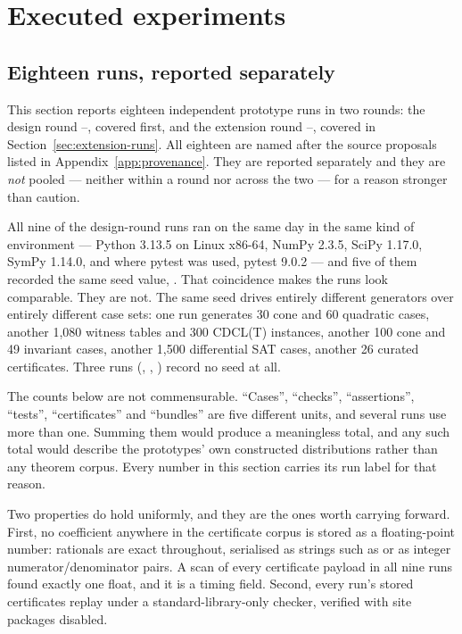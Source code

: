 \section{Executed experiments}
\label{sec:experiments}

\subsection{Eighteen runs, reported separately}

This section reports eighteen independent prototype runs in two rounds: the
design round --, covered first, and the extension round
--, covered in Section~\ref{sec:extension-runs}. All
eighteen are named after the source proposals listed in
Appendix~\ref{app:provenance}. They are reported separately and they are
\emph{not} pooled --- neither within a round nor across the two --- for a
reason stronger than caution.

All nine of the design-round runs ran on the same day in the same kind of
environment --- Python 3.13.5
on Linux x86-64, NumPy 2.3.5, SciPy 1.17.0, SymPy 1.14.0, and where pytest was
used, pytest 9.0.2 --- and five of them recorded the same seed value,
. That coincidence makes the runs look comparable. They are not.
The same seed drives entirely different generators over entirely different case
sets: one run generates 30 cone and 60 quadratic cases, another 1{,}080 witness
tables and 300 CDCL(T) instances, another 100 cone and 49 invariant cases,
another 1{,}500 differential SAT cases, another 26 curated certificates. Three
runs (, , ) record no seed at all.

\begin{remark}
The counts below are not commensurable. ``Cases'', ``checks'', ``assertions'',
``tests'', ``certificates'' and ``bundles'' are five different units, and several
runs use more than one. Summing them would produce a meaningless total, and any
such total would describe the prototypes' own constructed distributions rather
than any theorem corpus. Every number in this section carries its run label for
that reason.
\end{remark}

Two properties do hold uniformly, and they are the ones worth carrying forward.
First, no coefficient anywhere in the certificate corpus is stored as a
floating-point number: rationals are exact throughout, serialised as strings
such as  or as integer numerator/denominator pairs. A scan of
every certificate payload in all nine runs found exactly one float, and it is a
timing field. Second, every run's stored certificates replay under a
standard-library-only checker, verified with site packages disabled.

